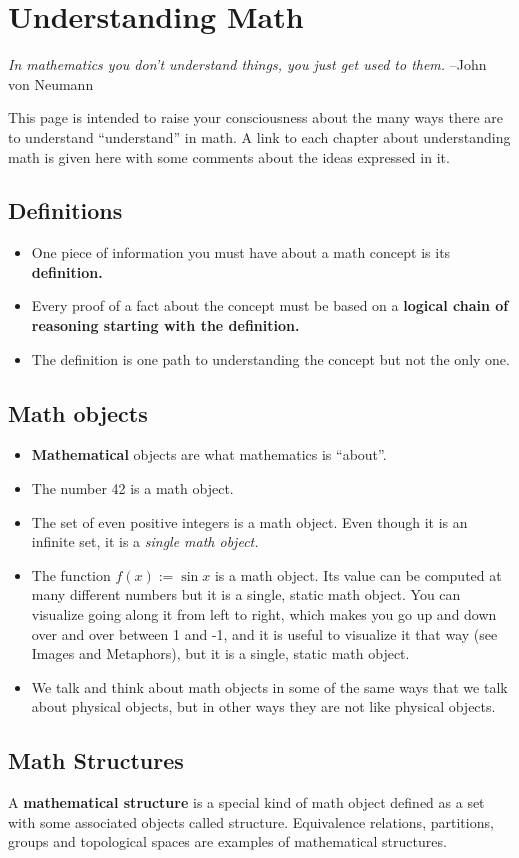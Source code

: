 \section{Understanding Math}
    \textit{In mathematics you don’t understand things, you just get used to them.}
    –John von Neumann

    This page is intended to raise your consciousness about the many ways there are
    to understand “understand” in math. A link to each chapter about understanding
    math is given here with some comments about the ideas expressed in it.

    \subsection{Definitions}
        \begin{itemize}
            \item{One piece of information you must have about a math concept is its \textbf{definition.}}

            \item{Every proof of a fact about the concept must be based on a
                \textbf{logical chain of reasoning starting with the definition.}}

            \item{The definition is one path to understanding the concept but not the only one.}
        \end{itemize}

    \subsection{Math objects}
        \begin{itemize}
            \item{\textbf{Mathematical} objects are what mathematics is “about”.}

            \item{The number 42 is a math object.}

            \item{The set of even positive integers is a math object.
                  Even though it is an infinite set, it is a \textit{single math object.}}

            \item{The function $f(x):={{\sin }}x$ is a math object. Its value can be
                  computed at many different numbers but it is a single, static
                  math object. You can visualize going along it from left to right,
                  which makes you go up and down over and over between 1 and -1, and it
                  is useful to visualize it that way (see Images and Metaphors), but it is a
                  single, static math object.}

            \item{We talk and think about math objects in some of the same ways
                  that we talk about physical objects, but in other ways they are
                  not like physical objects.}
        \end{itemize}

    \subsection{Math Structures}
        A \textbf{mathematical structure} is a special kind of math object defined as a set with some associated objects called structure.  Equivalence relations, partitions, groups and topological spaces are examples of mathematical structures.
